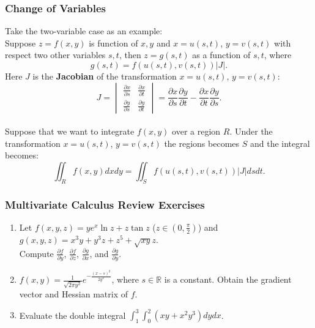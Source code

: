 \documentclass{beamer}
\begin{document}
\begin{frame} 
\frametitle{Change of Variables}
Take the two-variable case as an example:\\
Suppose $z=f(x,y)$ is function of $x,y$ and $x = u(s,t)$, $y = v(s,t)$ with respect two other variables $s,t$, then $z=g(s,t)$ as a function of $s,t$, where
$$
g(s,t) = f(u(s,t),v(s,t))\vert J\vert.
$$
Here $J$ is the \textbf{Jacobian} of the transformation $x = u(s,t)$, $y = v(s,t)$:
$$
J =
\begin{vmatrix}
\frac{\partial x}{\partial s} & \frac{\partial x}{\partial t} \\
\frac{\partial y}{\partial s} & \frac{\partial y}{\partial t}
\end{vmatrix}
= \frac{\partial x}{\partial s}\frac{\partial y}{\partial t} - \frac{\partial x}{\partial t}\frac{\partial y}{\partial s}.
$$
~\\
Suppose that we want to integrate $f(x,y)$ over a region $R$. Under the transformation $x = u(s,t)$, $y = v(s,t)$ the regions becomes $S$ and the integral becomes:
$$
\iint_R f(x,y) dxdy = \iint_S f(u(s,t),v(s,t))\vert J\vert dsdt.
$$
\end{frame}


\begin{frame}
\frametitle{Multivariate Calculus Review Exercises}
\begin{enumerate}
\item Let $f(x,y,z)=ye^x \ln z + z \tan z$ ($z \in (0,\frac{\pi}{2})$) and $g(x,y,z)=x^3y+y^3z+z^5+\sqrt{xy}z$.\\ Compute $\frac{\partial f}{\partial y}$, $\frac{\partial f}{\partial z}$, $\frac{\partial g}{\partial x}$, and $\frac{\partial g}{\partial y}$.
\vspace*{0.5in}
\item $f(x,y) = \frac{1}{\sqrt{2\pi y^2}}e^{-\frac{(x-s)^2}{2y^2}}$, where $s \in \mathbb{R}$ is a constant. Obtain the gradient vector and Hessian matrix of $f$.
\vspace*{0.5in}
\item Evaluate the double integral $\int_1^3 \int_0^2 (xy + x^2y^3)dydx$.
\end{enumerate}




\end{frame}
\end{document}
